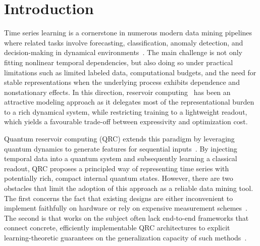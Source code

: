 \section{Introduction}\label{sec:intro}
Time series learning is a cornerstone in numerous modern data mining pipelines where related tasks involve forecasting, classification, anomaly detection, and decision-making in dynamical environments~\cite{esling2012timeseries, chandola2009anomaly, aaraba2024fr}. The main challenge is not only fitting nonlinear temporal dependencies, but also doing so under practical limitations such as limited labeled data, computational budgets, and the need for stable representations when the underlying process exhibits dependence and nonstationary effects. In this direction, reservoir computing~\cite{Jaeger2001EchoState, Grigoryeva_Ortega_2018} has been an attractive modeling approach as it delegates most of the representational burden to a rich dynamical system, while restricting training to a lightweight readout, which yields a favourable trade-off between expressivity and optimization cost.

Quantum reservoir computing (QRC) extends this paradigm by leveraging quantum dynamics to generate features for sequential inputs~\cite{Fujii_Nakajima_2017,Chen_Nurdin_2019,Chen_Nurdin_Yamamoto_2020}. %
By injecting temporal data into a quantum system and subsequently learning a classical readout, QRC proposes a principled way of representing time series with potentially rich, compact internal quantum states. However, there are two obstacles that limit the adoption of this approach as a reliable data mining tool. The first concerns the fact that existing designs are either inconvenient to implement faithfully on hardware or rely on expensive measurement schemes~\cite{mujal2023weakproj, zhu2025minimalistic}. The second is that works on the subject often lack end-to-end frameworks that connect concrete, efficiently implementable QRC architectures to explicit learning-theoretic guarantees on the generalization capacity of such methods~\cite{mujal2021opportunities, qrc_risk_bounds_2025}.

